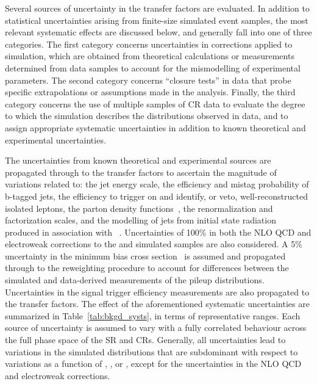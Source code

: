 Several sources of uncertainty in the transfer factors are evaluated.
In addition to statistical uncertainties arising from finite-size
simulated event samples, the most relevant systematic effects are
discussed below, and generally fall into one of three categories. The
first category concerns uncertainties in corrections applied to
simulation, which are obtained from theoretical calculations or
measurements determined from data samples to account for the
mismodelling of experimental parameters. The second category concerns
``closure tests'' in data that probe specific extrapolations or
assumptions made in the analysis. Finally, the third category concerns
the use of multiple samples of CR data to evaluate the degree to which
the simulation describes the \mht distributions observed in data, and
to assign appropriate systematic uncertainties in addition to known
theoretical and experimental uncertainties.

The uncertainties from known theoretical and experimental sources are
propagated through to the transfer factors to ascertain the magnitude
of variations related to: the jet energy scale, the efficiency and
mistag probability of b-tagged jets, the efficiency to trigger on and
identify, or veto, well-reconstructed isolated leptons, 
the parton density functions~\cite{Butterworth:2015oua}, the
renormalization and factorization scales, and the modelling of jets
from initial state radiation produced in association with
\ttbar~\cite{single-lepton-stop}. Uncertainties of 100\% in both the
NLO QCD and electroweak corrections to the \wj and \zj simulated
samples are also considered. A 5\% uncertainty in the minimum bias
cross section~\cite{Aaboud:2016mmw} is assumed and propagated through
to the reweighting procedure to account for differences between the
simulated and data-derived measurements of the pileup
distributions. Uncertainties in the signal trigger efficiency
measurements are also propagated to the transfer factors. The effect
of the aforementioned systematic uncertainties are summarized in
Table~\ref{tab:bkgd_systs}, in terms of representative ranges.  Each
source of uncertainty is assumed to vary with a fully correlated
behaviour across the full phase space of the SR and CRs. Generally,
all uncertainties lead to variations in the simulated \mht
distributions that are subdominant with respect to variations as a
function of \njet, \nb, or \scalht, except for the uncertainties in
the NLO QCD and electroweak corrections.

